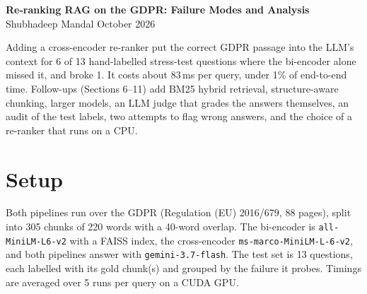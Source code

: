 \documentclass[10pt,a4paper]{article}
\begin{document}
\begin{center}
{\Large\bfseries Re-ranking RAG on the GDPR: Failure Modes and Analysis}\\[0.4em]
{\normalsize Shubhadeep Mandal \quad\textbar{} \quad\textbar{} October 2026}
\end{center}
\vspace{0.6em}

\noindent Adding a cross-encoder re-ranker put the correct GDPR passage into the LLM's context for 6 of 13
hand-labelled stress-test questions where the bi-encoder alone missed it, and broke 1. It costs about 83\,ms per
query, under 1\% of end-to-end time. Follow-ups (Sections 6--11) add BM25 hybrid retrieval, structure-aware
chunking, larger models, an LLM judge that grades the answers themselves, an audit of the test labels, two attempts
to flag wrong answers, and the choice of a re-ranker that runs on a CPU.

\section*{Setup}

Both pipelines run over the GDPR (Regulation (EU) 2016/679, 88 pages), split into 305 chunks of 220 words with a
40-word overlap. The bi-encoder is \texttt{all-MiniLM-L6-v2} with a FAISS index, the cross-encoder
\texttt{ms-marco-MiniLM-L-6-v2}, and both pipelines answer with \texttt{gemini-3.7-flash}. The test set is 13
questions, each labelled with its gold chunk(s) and grouped by the failure it probes. Timings are averaged over 5
runs per query on a CUDA GPU.
\end{document}
